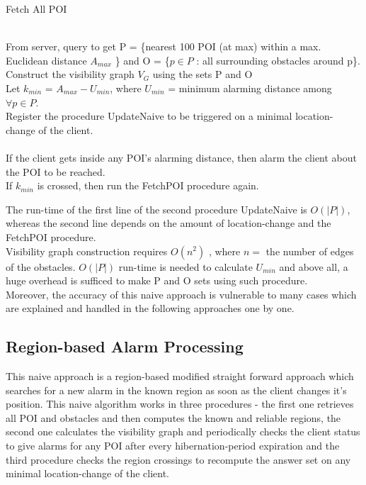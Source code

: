 \documentclass{sig-alternate}
\begin{document}
\begin{algorithm}
\caption{Fetch All POI}
\label{FetchPOI}
\begin{algorithmic}[1]
\\From server, query to get P = \{nearest 100 POI (at max) within a max. Euclidean distance $A_{max}$ \}  and O = \{$p \in P$ : all surrounding obstacles around p\}.
\\Construct the visibility graph $V_G$ using the sets P and O
\\Let $k_{min}$ = $A_{max} - U_{min}$, where $U_{min}$ = minimum alarming distance among $\forall p \in P$.
\\Register the procedure UpdateNaive to be triggered on a minimal location-change of the client.
\EndProcedure
\\
\\If the client gets inside any POI's alarming distance, then alarm the client about the POI to be reached.
\\If $k_{min}$ is crossed, then run the FetchPOI procedure again.
\EndProcedure
\end{algorithmic}
\end{algorithm}

The run-time of the first line of the second procedure UpdateNaive is $O(\left\vert{P}\right\vert)$, whereas the second line depends on the amount of location-change and the FetchPOI procedure.
\\Visibility graph construction requires $O(n^2)$ \cite{mur}, where $n =$ the number of edges of the obstacles. $O(\left\vert{P}\right\vert)$ run-time is needed to calculate $U_{min}$ and above all, a huge overhead is sufficed to make P and O sets using such procedure.
\\Moreover, the accuracy of this naive approach is vulnerable to many cases which are explained and handled in the following approaches one by one.


\subsection{Region-based Alarm Processing}
This naive approach is a region-based modified straight forward approach which searches for a new alarm in the known region as soon as the client changes it's position.
This naive algorithm works in three procedures - the first one retrieves all POI and obstacles and then computes the known and reliable regions, the second one calculates the visibility graph and periodically checks the client status to give alarms for any POI after every hibernation-period expiration and the third procedure checks the region crossings to recompute the answer set on any minimal location-change of the client.
\end{document}

